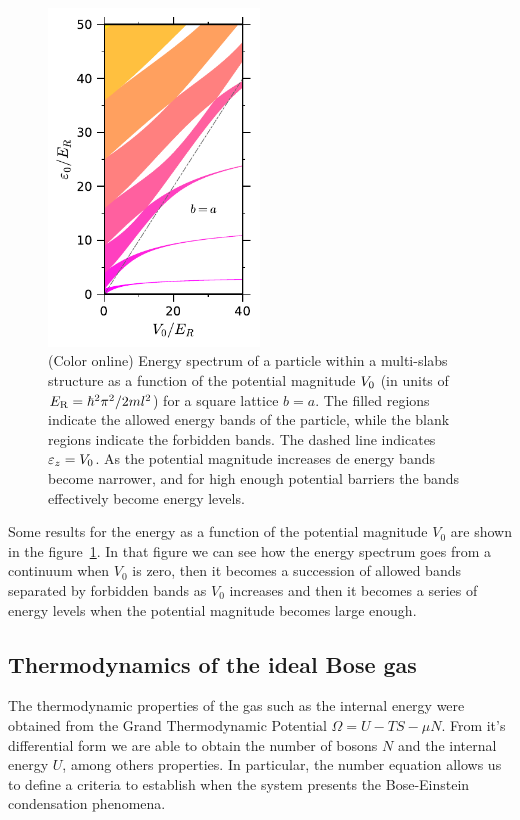 \begin{figure}
  \centering
  \includegraphics[width=0.5\textwidth]{./figures/energy-spectrum[ideal]_r-1}
  \caption{(Color online) Energy spectrum of a particle within a multi-slabs
    structure as a function of the potential magnitude ${V_0}$ (in units of $E_\mathrm{R}
      = \hbar^2 \pi^2/ 2ml^2$) for a square lattice $b = a$. The filled regions
    indicate the allowed energy bands of the particle, while the blank regions
    indicate the forbidden bands. The dashed line indicates ${\varepsilon}_{z} = {V_0}$. As the
    potential magnitude increases de energy bands become narrower, and for high
    enough potential barriers the bands effectively become energy
    levels.}\label{fig:ideal-energy-per-boson-as-u0-r-1}
\end{figure}

Some results for the energy as a function of the potential magnitude $V_0$ are
shown in the figure~\ref{fig:ideal-energy-per-boson-as-u0-r-1}. In that figure
we can see how the energy spectrum goes from a continuum when $V_0$ is zero,
then it becomes a succession of allowed bands separated by forbidden bands as
$V_0$ increases and then it becomes a series of energy levels when the potential
magnitude becomes large enough.

\subsection{Thermodynamics of the ideal Bose gas}

The thermodynamic properties of the gas such as the internal energy were
obtained from the Grand Thermodynamic Potential $\Omega = U - TS - \mu N$.
From it's differential form we are able to obtain the number of bosons $N$ and
the internal energy $U$, among others properties. In particular, the number
equation allows us to define a criteria to establish when the system presents
the Bose-Einstein condensation phenomena.

